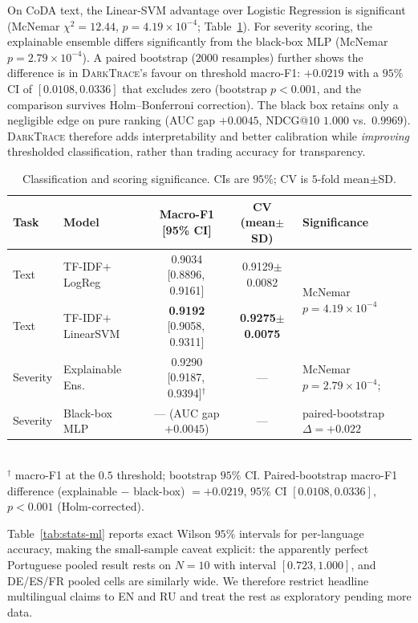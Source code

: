 \documentclass[11pt,a4paper]{article}
\newcommand{\framework}{\textsc{DarkTrace}}
\begin{document}
On CoDA text, the Linear-SVM advantage over Logistic Regression is significant
(McNemar $\chi^2=12.44$, $p=4.19\times10^{-4}$; Table~\ref{tab:stats-cls}). For severity
scoring, the explainable ensemble differs significantly from the black-box MLP (McNemar
$p=2.79\times10^{-4}$). A paired bootstrap ($2000$ resamples) further shows the difference
is in \framework{}'s favour on threshold macro-F1: $+0.0219$ with a $95\%$ CI of
$[0.0108,0.0336]$ that excludes zero (bootstrap $p<0.001$, and the comparison survives
Holm--Bonferroni correction). The black box retains only a negligible edge on pure ranking
(AUC gap $+0.0045$, NDCG@10 $1.000$ vs.\ $0.9969$). \framework{} therefore adds
interpretability and better calibration while \emph{improving} thresholded classification,
rather than trading accuracy for transparency.

\begin{table}[h]
\centering
\caption{Classification and scoring significance. CIs are $95\%$; CV is $5$-fold
mean$\pm$SD.}
\label{tab:stats-cls}
\small
\begin{tabular}{@{}llccl@{}}
\toprule
\textbf{Task} & \textbf{Model} & \textbf{Macro-F1 [95\% CI]} & \textbf{CV (mean$\pm$SD)} & \textbf{Significance} \\
\midrule
Text & TF-IDF$+$LogReg     & 0.9034 [0.8896,\,0.9161] & 0.9129$\pm$0.0082 & \multirow{2}{*}{McNemar $p=4.19\!\times\!10^{-4}$} \\
Text & TF-IDF$+$LinearSVM  & \textbf{0.9192} [0.9058,\,0.9311] & \textbf{0.9275$\pm$0.0075} & \\
\midrule
Severity & Explainable Ens. & 0.9290 [0.9187,\,0.9394]$^{\dagger}$ & --- & McNemar $p=2.79\!\times\!10^{-4}$; \\
Severity & Black-box MLP     & --- (AUC gap $+0.0045$) & --- & paired-bootstrap $\Delta=+0.022$\\
\bottomrule
\end{tabular}
\\[2pt]{\footnotesize $^{\dagger}$ macro-F1 at the $0.5$ threshold; bootstrap $95\%$ CI.
Paired-bootstrap macro-F1 difference (explainable $-$ black-box) $=+0.0219$, $95\%$ CI
$[0.0108,0.0336]$, $p<0.001$ (Holm-corrected).}
\end{table}

Table~\ref{tab:stats-ml} reports exact Wilson $95\%$ intervals for per-language accuracy,
making the small-sample caveat explicit: the apparently perfect Portuguese pooled result
rests on $N=10$ with interval $[0.723,1.000]$, and DE/ES/FR pooled cells are similarly
wide. We therefore restrict headline multilingual claims to EN and RU and treat the rest
as exploratory pending more data.
\end{document}
